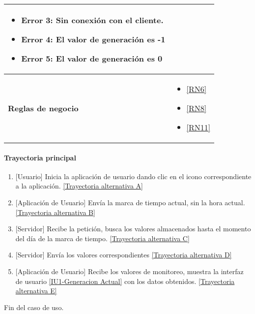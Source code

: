 \begin{longtable}{|J{5cm}|J{10.3cm}|}
\begin{itemize}
		    \item \label{CU5:Error3} Error 3: Sin conexión con el cliente.
		    \item \label{CU5:Error4} Error 4: El valor de generación es -1
		    \item \label{CU5:Error5} Error 5: El valor de generación es 0
		\end{itemize} \\ \hline
	\textbf{Reglas de negocio} & 
		\begin{itemize}
		    \item \ref{RN6}
			\item \ref{RN8}
			\item \ref{RN11}
		\end{itemize} \\ \hline
\end{longtable}

\paragraph{Trayectoria principal}
    \label{SUB-U-CU1.5:TP}
	\begin{enumerate}
	    \item {[Usuario]} Inicia la aplicación de usuario dando clic en el icono correspondiente a la aplicación. \hyperref[SUB-U-CU1.5:TA]{[Trayectoria alternativa A]}
	    \item {[Aplicación de Usuario]} Envía la marca de tiempo actual, sin la hora actual. \hyperref[SUB-U-CU1.5:TB]{[Trayectoria alternativa B]} 
	    \item {[Servidor]} Recibe la petición, busca los valores almacenados hasta el momento del día de la marca de tiempo. \hyperref[SUB-U-CU1.5:TC]{[Trayectoria alternativa C]}
	    \item {[Servidor]} Envía los valores correspondientes \hyperref[SUB-U-CU1.5:TD]{[Trayectoria alternativa D]} 
	    \item {[Aplicación de Usuario]} Recibe los valores de monitoreo, muestra la interfaz de usuario \hyperref[fig:monitoreo]{[IU1-Generacion Actual]} con los datos obtenidos. \hyperref[SUB-U-CU1.5:TE]{[Trayectoria alternativa E]}
	\end{enumerate}
	Fin del caso de uso.

